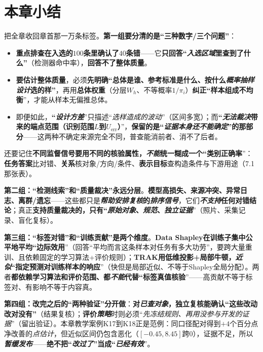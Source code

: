 \section{本章小结}
\label{sec:knowledge-quality-assessment-correction-summary}

把全章收回章首那一万条标签。\textbf{第一组要分清的是“三种数字/三个问题”}：
\begin{itemize}\item \textbf{重点排查在入选的$100$条里确认了$40$条错}——它\textbf{只回答“\emph{入选区域}里查到了什么”}（检测器命中率），\textbf{回答不了整体质量}。\item \textbf{要估计整体质量}，必须\textbf{先明确“总体是谁、参考标准是什么、按什么\emph{概率抽样设计}选的样”}，再用\textbf{总体权重}（分层$W_h$、不等概率$1/\pi_i$）\textbf{纠正“样本组成不均衡}”，才能从样本无偏推总体。\item 即便如此，\textbf{“\emph{设计方差}}”只描述“\emph{选样造成的波动}”（区间多宽）；而\textbf{“\emph{无法裁决}带来的端点范围（识别范围$L$到$U_{\mathrm{err}}$）}”，\textbf{保留的是“\emph{证据本身还不能确定}”的那部分}——这两种不确定来源完全不同，普查能消前者、消不了后者。\end{itemize}
还要记住\textbf{不同监督信号要用不同的核验属性，\emph{不能}统一糊成一个“类别正确率}”：\textbf{任务答案}比对错、\textbf{关系}核对象/方向/条件、\textbf{表示目标}查构造条件与下游用途（7.1那张表）。

\textbf{第二组：“检测线索”和“质量裁决”永远分层}。\textbf{模型高损失、来源冲突、异常日志、离群/遗忘}——这些都只是\textbf{\emph{帮助安排复核}的\emph{排序信号}}，它们\textbf{\emph{不支持}任何对错结论}；真正\textbf{支持质量裁决的，只有“\emph{原始对象}、\emph{规范}、\emph{独立证据}}”（照片、采集记录、盲化复标）。

\textbf{第三组：“标签对错”和“训练贡献”是两个维度}。\textbf{Data Shapley}\textbf{在训练子集中公平地平均“边际效用}”（回答“平均而言这条样本对任务有多大功劳”，要跨大量重训、且依赖固定的学习算法+评价规则）；\textbf{TRAK}\textbf{用低维投影+局部牛顿，\emph{近似}“指定预测对训练样本的响应}”（快但是局部近似、不等于Shapley全局分配）。两者\textbf{都依赖学习算法和评价范围、都\emph{不能}代替“标签真值核验}”——高贡献不等于标签对、有影响不等于内容真。

\textbf{第四组：改完之后的“两种验证”分开做}：\textbf{对\emph{已查对象}，独立复核能确认“这些改动改对没有”}（结果复核）；\textbf{评价\emph{策略}}时则必须“\emph{先冻结规则、再用\emph{没参与开发}的证据}”（留出验证）。本章教学案例K17到K18正是范例：同口径配对得到$+4$个百分点净改善的\emph{点估计}，但近似区间仍包含恶化（$[-0.45,8.45]$跨0），证据不足，所以\textbf{\emph{暂缓发布}}——\textbf{绝不把“\emph{改过了}”当成“\emph{已经有效}}”。

